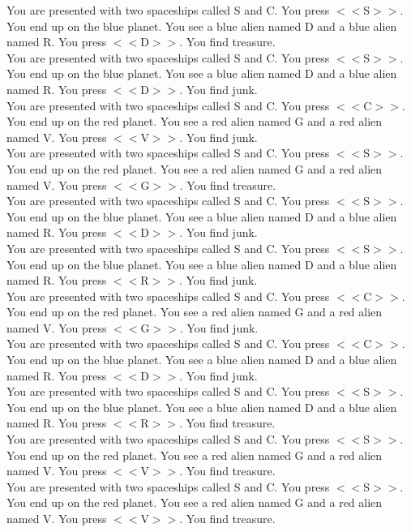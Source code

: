 \documentclass[pdflatex,sn-nature]{sn-jnl}%
\theoremstyle{thmstyleone}%
\theoremstyle{thmstyletwo}%
\theoremstyle{thmstylethree}%
\begin{document}
You are presented with two spaceships called S and C. You press $<<$S$>>$. You end up on the blue planet. You see a blue alien named D and a blue alien named R. You press $<<$D$>>$. You find treasure. $~$\\ 
You are presented with two spaceships called S and C. You press $<<$S$>>$. You end up on the blue planet. You see a blue alien named D and a blue alien named R. You press $<<$D$>>$. You find junk. $~$\\ 
You are presented with two spaceships called S and C. You press $<<$C$>>$. You end up on the red planet. You see a red alien named G and a red alien named V. You press $<<$V$>>$. You find junk. $~$\\ 
You are presented with two spaceships called S and C. You press $<<$S$>>$. You end up on the red planet. You see a red alien named G and a red alien named V. You press $<<$G$>>$. You find treasure. $~$\\ 
You are presented with two spaceships called S and C. You press $<<$S$>>$. You end up on the blue planet. You see a blue alien named D and a blue alien named R. You press $<<$D$>>$. You find junk. $~$\\ 
You are presented with two spaceships called S and C. You press $<<$S$>>$. You end up on the blue planet. You see a blue alien named D and a blue alien named R. You press $<<$R$>>$. You find junk. $~$\\ 
You are presented with two spaceships called S and C. You press $<<$C$>>$. You end up on the red planet. You see a red alien named G and a red alien named V. You press $<<$G$>>$. You find junk. $~$\\ 
You are presented with two spaceships called S and C. You press $<<$C$>>$. You end up on the blue planet. You see a blue alien named D and a blue alien named R. You press $<<$D$>>$. You find junk. $~$\\ 
You are presented with two spaceships called S and C. You press $<<$S$>>$. You end up on the blue planet. You see a blue alien named D and a blue alien named R. You press $<<$R$>>$. You find treasure. $~$\\ 
You are presented with two spaceships called S and C. You press $<<$S$>>$. You end up on the red planet. You see a red alien named G and a red alien named V. You press $<<$V$>>$. You find treasure. $~$\\ 
You are presented with two spaceships called S and C. You press $<<$S$>>$. You end up on the red planet. You see a red alien named G and a red alien named V. You press $<<$V$>>$. You find treasure. $~$\\ 
\end{document}
